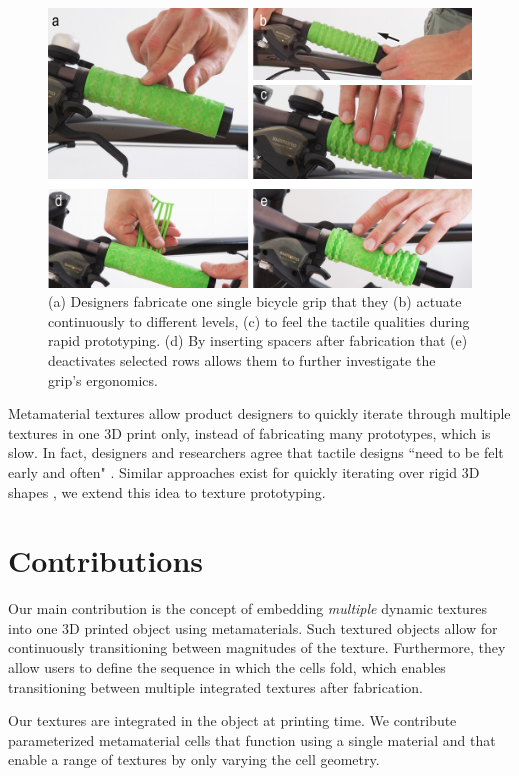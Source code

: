 \begin{figure} [!h]  
    \includegraphics[width=\textwidth]{chapters/metamaterial-textures-FIG/6-bike-grip.pdf}
    \caption[Short figure name.]{(a) Designers fabricate one single bicycle grip that they (b) actuate continuously to different levels, (c) to feel the tactile qualities during rapid prototyping. (d) By inserting spacers after fabrication that (e) deactivates selected rows allows them to further investigate the grip’s ergonomics.
    \label{fig:6-bike-grip}}
\end{figure}

Metamaterial textures allow product designers to quickly iterate through multiple textures in one 3D print only, instead of fabricating many prototypes, which is slow. In fact, designers and researchers agree that tactile designs ``need to be felt early and often" \cite{Schneider2017}. Similar approaches exist for quickly iterating over rigid 3D shapes \cite{Mueller2014a}, we extend this idea to texture prototyping. 


\section{Contributions}
Our main contribution is the concept of embedding \textit{multiple} dynamic textures into one 3D printed object using metamaterials. Such textured objects allow for continuously transitioning between magnitudes of the texture. Furthermore, they allow users to define the sequence in which the cells fold, which enables transitioning between multiple integrated textures after fabrication. 

Our textures are integrated in the object at printing time. We contribute parameterized metamaterial cells that function using a single material and that enable a range of textures by only varying the cell geometry. 

